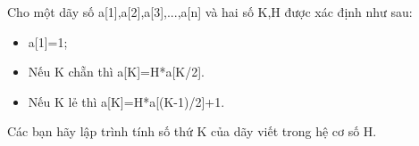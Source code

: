 Cho một dãy số a[1],a[2],a[3],...,a[n] và hai số K,H được xác định như sau:  
\begin{itemize}
	\item     a[1]=1;   
	\item     Nếu K chẵn thì a[K]=H*a[K/2].   
	\item     Nếu K lẻ thì a[K]=H*a[(K-1)/2]+1.   
\end{itemize}

   Các bạn hãy lập trình tính số thứ K của dãy viết trong hệ cơ số H.